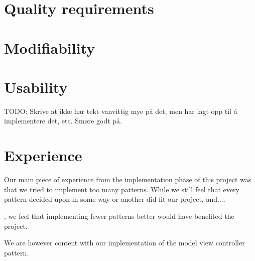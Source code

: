 \section{Quality requirements}

\section{Modifiability}


\section{Usability}
TODO: Skrive at ikke har tekt vanvittig mye på det, men har lagt opp til å implementere det, etc. Smøre godt på.




\section{Experience} %
Our main piece of experience from the implementation phase of this project was that we tried to implement too many patterns. While we still feel that every pattern decided upon in some way or another did fit our project, and.... 

, we feel that implementing fewer patterns better would have benefited the project.

We are however content with our implementation of the model view controller pattern.







